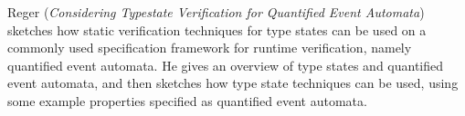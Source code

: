 

Reger
\cite{isola-2016-reger}
({\em Considering Typestate Verification for Quantified 
Event Automata})
sketches how static verification techniques for type states can be used on a commonly used specification framework for runtime verification, namely quantified event automata.
He gives an overview of type states and quantified event automata, and
then sketches how type state techniques can be used, using some example properties specified as quantified event
automata.
